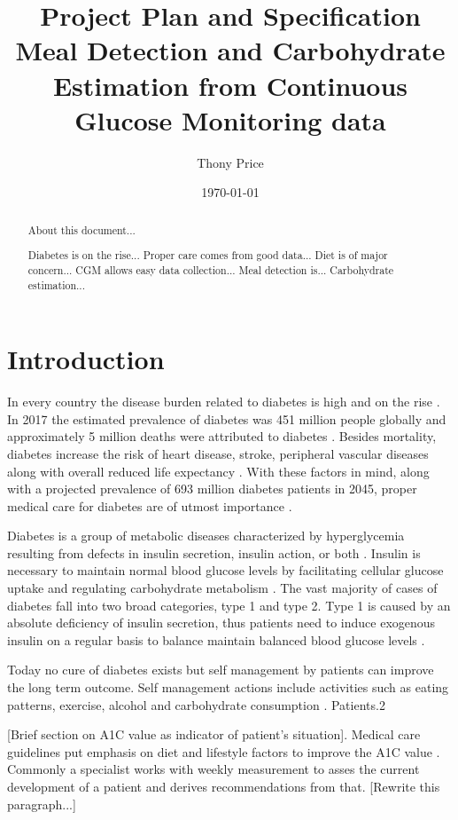 \documentclass{kththesis}
\title{%
    Project Plan and Specification \\
    \vspace{.5em}
    \large Meal Detection and Carbohydrate Estimation from Continuous Glucose Monitoring data \\
}
\author{Thony Price}
\date{\today}
\begin{document}
\frontmatter
\titlepage

\begin{abstract}
  About this document...

  Diabetes is on the rise...
  Proper care comes from good data...
  Diet is of major concern...
  CGM allows easy data collection...
  Meal detection is...
  Carbohydrate estimation...
\end{abstract}

\tableofcontents
\mainmatter

\chapter{Introduction}

In every country the disease burden related to diabetes is high and on the rise \parencite{Forouhi2014}.
In 2017 the estimated prevalence of diabetes was 451 million people globally and approximately 5 million deaths were attributed to diabetes \parencite{Cho2018}.
Besides mortality, diabetes increase the risk of heart disease, stroke, peripheral vascular diseases along with overall reduced life expectancy \parencite{Forouhi2014}.
With these factors in mind, along with a projected prevalence of 693 million diabetes patients in 2045, proper medical care for diabetes are of utmost importance \parencite{Cho2018}.

Diabetes is a group of metabolic diseases characterized by hyperglycemia resulting from defects in insulin secretion, insulin action, or both \parencite{ADA2010}.
Insulin is necessary to maintain normal blood glucose levels by facilitating cellular glucose uptake and regulating carbohydrate metabolism \parencite{Wilcox2005}.
The vast majority of cases of diabetes fall into two broad categories, type 1 and type 2.
Type 1 is caused by an absolute deficiency of insulin secretion, thus
patients need to induce exogenous insulin on a regular basis to balance maintain balanced blood glucose levels \parencite{ADA2010}.

Today no cure of diabetes exists but self management by patients can improve the long term outcome.
Self management actions include activities such as eating patterns, exercise, alcohol and carbohydrate consumption \parencite{S38}.
Patients.2

[Brief section on A1C value as indicator of patient's situation].
Medical care guidelines put emphasis on diet and lifestyle factors to improve the A1C value \parencite{ADA2018}.
Commonly a specialist works with weekly measurement to asses the current development of a patient and derives recommendations from that. [Rewrite this paragraph...]
\end{document}
